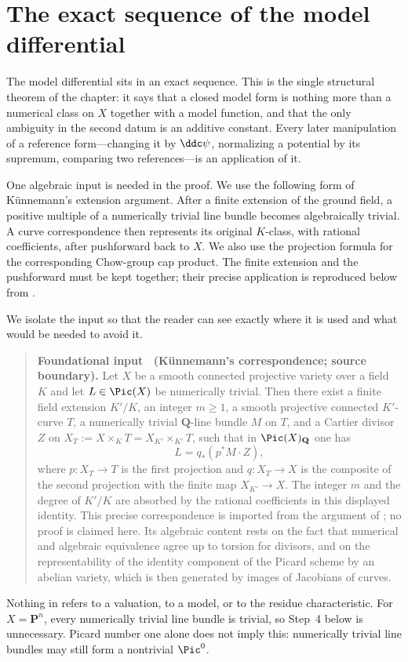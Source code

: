 \section{The exact sequence of the model differential}
\label{sec:ch20-exact}

The model differential sits in an exact sequence.  This is the single
structural theorem of the chapter: it says that a closed model form is
nothing more than a numerical class on $X$ together with a model function,
and that the only ambiguity in the second datum is an additive constant.
Every later manipulation of a reference form---changing it by $\ddc\psi$,
normalizing a potential by its supremum, comparing two references---is an
application of it.

One algebraic input is needed in the proof.  We use the following form of
K\"unnemann's extension argument.  After a finite extension of the ground
field, a positive multiple of a numerically trivial line bundle becomes
algebraically trivial.  A curve correspondence then represents its original
$K$-class, with rational coefficients, after pushforward back to $X$.
We also use the projection formula for the corresponding Chow-group cap
product.  The finite extension and the pushforward must be kept together;
their precise application is reproduced below from
\cite[proof of Theorem~4.3]{BFJ16}.

We isolate the input so that the reader can see exactly where it is used and
what would be needed to avoid it.

\label{lem:ch20-kunnemann-input}
\begin{quote}
\textbf{Foundational input \thelemma\ (K\"unnemann's correspondence;
source boundary).}
Let $X$ be a smooth connected projective variety over a field $K$ and
let $L\in\Pic(X)$ be numerically trivial.  Then there exist a finite field
extension $K'/K$, an integer $m\geq1$, a smooth projective connected
$K'$-curve $T$, a numerically trivial $\mathbf Q$-line bundle $M$ on
$T$, and a Cartier divisor $Z$ on
$X_T:=X\times_KT=X_{K'}\times_{K'}T$, such that in
$\Pic(X)_{\mathbf Q}$ one has
\[
                 L=q_*(p^*M\cdot Z),
\]
where $p:X_T\to T$ is the first projection and
$q:X_T\to X$ is the composite of the second projection with the finite
map $X_{K'}\to X$.  The integer $m$ and the degree of $K'/K$ are
absorbed by the rational coefficients in this displayed identity.
This precise correspondence is imported from the argument of
\cite[proof of Theorem~4.3]{BFJ16}; no proof is claimed here.  Its
algebraic content rests on the fact that numerical and
algebraic equivalence agree up to torsion for divisors, and on the
representability of the identity component of the Picard scheme by an
abelian variety, which is then generated by images of Jacobians of curves.
\end{quote}
Nothing in  refers to a valuation, to a
model, or to the residue characteristic.  For $X=\mathbf P^n$, every
numerically trivial line bundle is trivial, so Step~4 below is unnecessary.
Picard number one alone does not imply this: numerically trivial line
bundles may still form a nontrivial $\Pic^0$.

